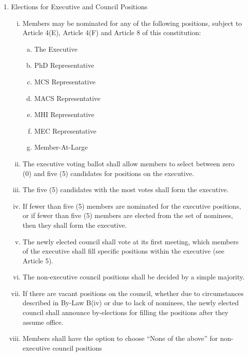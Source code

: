 \documentclass[]{report}
\begin{document}
{\begin{enumerate}
		\item Elections for Executive and Council Positions
			\begin{enumerate}[i.]
				\item Members may be nominated for any of the following positions, subject to Article 4(E), Article 4(F) and Article 8 of this constitution:
				\begin{enumerate}[a.]
					\item The Executive
					\item PhD Representative
					\item MCS Representative
					\item MACS Representative
					\item MHI Representative
					\item MEC Representative
					\item Member-At-Large
				\end{enumerate}
				\item The executive voting ballot shall allow members to select between zero (0) and five (5) candidates for positions on the executive. 
				\item The five (5) candidates with the most votes shall form the executive.
				\item If fewer than five (5) members are nominated for the executive positions, or if fewer than five (5) members are elected from the set of nominees, then they shall form the executive.
				\item The newly elected council shall vote at its first meeting, which members of the executive shall fill specific positions within the executive (see Article 5).
				\item The non-executive council positions shall be decided by a simple majority.
				\item If there are vacant positions on the council, whether due to circumstances described in By-Law B(iv) or due to lack of nominees, the newly elected council shall announce by-elections for filling the positions after they assume office.
				\item Members shall have the option to choose ``None of the above'' for non-executive council positions
			\end{enumerate}
	

\end{enumerate}}
\end{document}
